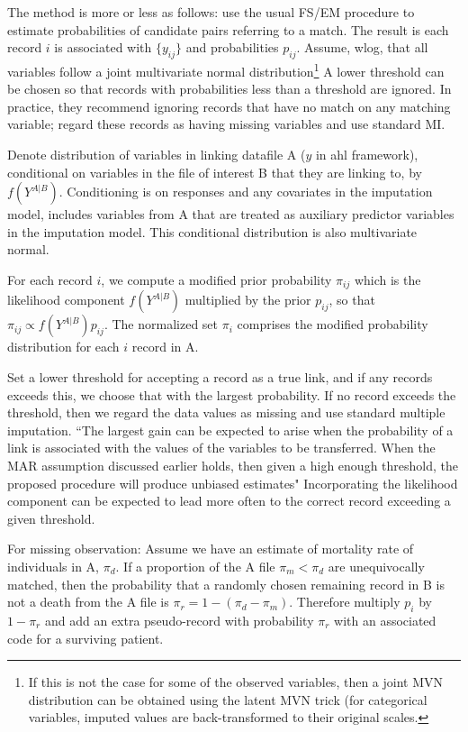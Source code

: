 \documentclass[12pt]{article}
\begin{document}
The method is more or less as follows: use the usual FS/EM procedure to estimate probabilities of candidate pairs referring to a match.  The result is each record $i$ is associated with $\{y_{ij}\}$ and probabilities $p_{ij}$.  Assume, wlog, that all variables follow a joint multivariate normal distribution\footnote{If this is not the case for some of the observed variables, then a joint MVN distribution can be obtained using the latent MVN trick (for categorical variables, imputed values are back-transformed to their original scales.} A lower threshold can be chosen so that records with probabilities less than a threshold are ignored.  In practice, they recommend ignoring records that have no match on any matching variable; regard these records as having missing variables and use standard MI.

Denote distribution of variables in linking datafile A ($y$ in ahl framework), conditional on variables in the file of interest B that they are linking to, by $f(Y^{A|B})$.   Conditioning is on responses and any covariates in the imputation model, includes variables from A that are treated as auxiliary predictor variables in the imputation model.  This conditional distribution is also multivariate normal.  

For each record $i$, we compute a modified prior probability $\pi_{ij}$ which is the likelihood component $f(Y^{A|B})$ multiplied by the prior $p_{ij}$, so that $\pi_{ij} \propto f(Y^{A|B}) p_{ij}$.  The normalized set $\pi_i$ comprises the modified probability distribution for each $i$ record in A.  

Set a lower threshold for accepting a record as a true link, and if any records exceeds this, we choose that with the largest probability.  If no record exceeds the threshold, then we regard the data values as missing and use standard multiple imputation.  ``The largest gain can be expected to arise
when the probability of a link is associated with the values of the variables to be transferred. When the
MAR assumption discussed earlier holds, then given a high enough threshold, the proposed procedure
will produce unbiased estimates" Incorporating the likelihood component can be expected to lead more often to the correct record exceeding a given threshold. 

For missing observation: Assume we have an estimate of mortality rate of individuals in A, $\pi_d$.  If a proportion of the A file $\pi_m < \pi_d$ are unequivocally matched, then the probability that a randomly chosen remaining record in B is not a death from the A file is $\pi_r = 1 - (\pi_d - \pi_m)$.  Therefore multiply $p_i$ by $1-\pi_r$ and add an extra pseudo-record with probability $\pi_r$ with an associated code for a surviving patient. 
\end{document}
